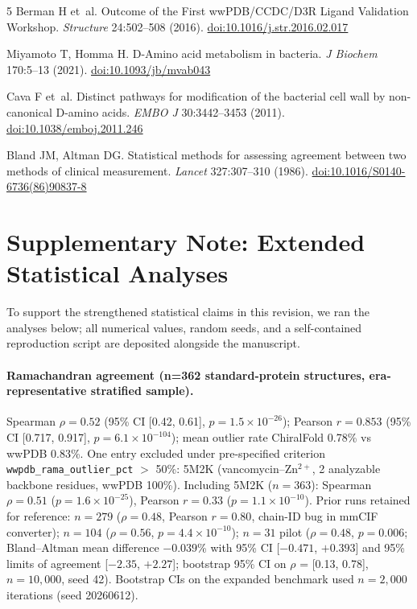 \documentclass[11pt]{article}
\begin{document}
\begin{thebibliography}{5}
Berman H et~al.
\newblock Outcome of the First wwPDB/CCDC/D3R Ligand Validation Workshop.
\newblock \textit{Structure} 24:502--508 (2016).
\newblock \href{https://doi.org/10.1016/j.str.2016.02.017}{doi:10.1016/j.str.2016.02.017}

Miyamoto T, Homma H.
\newblock D-Amino acid metabolism in bacteria.
\newblock \textit{J Biochem} 170:5--13 (2021).
\newblock \href{https://doi.org/10.1093/jb/mvab043}{doi:10.1093/jb/mvab043}

Cava F et~al.
\newblock Distinct pathways for modification of the bacterial cell wall by non-canonical D-amino acids.
\newblock \textit{EMBO J} 30:3442--3453 (2011).
\newblock \href{https://doi.org/10.1038/emboj.2011.246}{doi:10.1038/emboj.2011.246}

Bland JM, Altman DG.
\newblock Statistical methods for assessing agreement between two methods of clinical measurement.
\newblock \textit{Lancet} 327:307--310 (1986).
\newblock \href{https://doi.org/10.1016/S0140-6736(86)90837-8}{doi:10.1016/S0140-6736(86)90837-8}

\end{thebibliography}

\section*{Supplementary Note: Extended Statistical Analyses}

To support the strengthened statistical claims in this revision, we ran the analyses below; all numerical values, random seeds, and a self-contained reproduction script are deposited alongside the manuscript.

\paragraph{Ramachandran agreement (n=362 standard-protein structures, era-representative stratified sample).} Spearman $\rho=0.52$ (95\% CI [0.42, 0.61], $p=1.5\times10^{-26}$); Pearson $r=0.853$ (95\% CI [0.717, 0.917], $p=6.1\times10^{-104}$); mean outlier rate ChiralFold 0.78\% vs wwPDB 0.83\%. One entry excluded under pre-specified criterion \texttt{wwpdb\_rama\_outlier\_pct} $>$ 50\%: 5M2K (vancomycin--Zn$^{2+}$, 2 analyzable backbone residues, wwPDB 100\%). Including 5M2K ($n=363$): Spearman $\rho=0.51$ ($p=1.6\times10^{-25}$), Pearson $r=0.33$ ($p=1.1\times10^{-10}$). Prior runs retained for reference: $n=279$ ($\rho=0.48$, Pearson $r=0.80$, chain-ID bug in mmCIF converter); $n=104$ ($\rho=0.56$, $p=4.4\times10^{-10}$); $n=31$ pilot ($\rho=0.48$, $p=0.006$; Bland--Altman mean difference $-0.039$\% with 95\% CI [$-0.471$, $+0.393$] and 95\% limits of agreement [$-2.35$, $+2.27$]; bootstrap 95\% CI on $\rho$ = [0.13, 0.78], $n=10{,}000$, seed 42). Bootstrap CIs on the expanded benchmark used $n=2{,}000$ iterations (seed 20260612).
\end{document}
